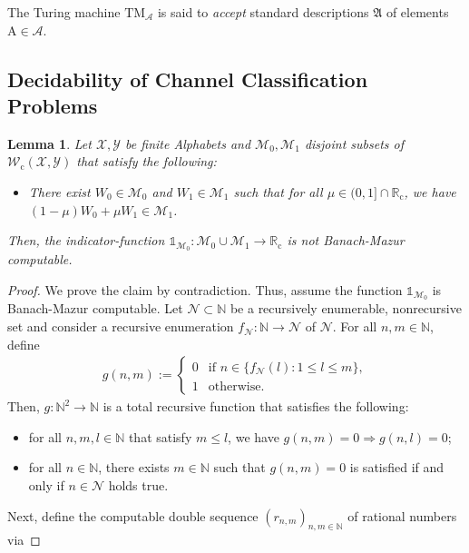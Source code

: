 \documentclass[conference]{IEEEtran}
\def\A{{\mathcal A}}
\def\X{{\mathcal X}}
\def\Y{{\mathcal Y}}
\def\M{{\mathcal M}}
\def\N{{\mathcal N}}
\def\W{{\mathcal W}}
\def\NN{{\mathbb N}}
\def\RR{{\mathbb R}}
\newcommand{\RRc}{\RR_{\mathrm{c}}}
\def\mA{\bm{\mathrm{A}}}
\newcommand{\TM}{\mathrm{TM}}
\newcommand{\Wc}{\W_{\mathrm{c}}}
\newcommand{\revision}[1]{}
\newtheorem{Lemma}[Theorem]{Lemma}
\begin{document}
	\noindent The Turing machine \(\TM_\A\) is said to \emph{accept} standard descriptions \(\mathfrak{A}\) of elements \(\mA\in\A\).
	
	\revision{Decidability, recursiveness, the indicator function and their relation.}
	
	\subsection{Decidability of Channel Classification Problems}
	\begin{Lemma}	\label{lem:IndicatorFunctionBanachMazur}
					Let \(\X,\Y\) be finite Alphabets and \(\M_0, \M_1\) disjoint subsets of \(\Wc(\X,\Y)\) that satisfy the following:
					\begin{itemize}	\item There exist \(W_0\in\M_0\) and \(W_1\in\M_1\) such that for all \(\mu \in (0,1]\cap \RRc\), 													
										we have \((1-\mu)W_0 + \mu W_1 \in \M_1\). 
					\end{itemize}
					Then, the indicator-function \(\mathds{1}_{\M_0} : \M_0\cup \M_1 \rightarrow \RRc\) is \emph{not} Banach-Mazur computable.
	\end{Lemma}\begin{proof}
					We prove the claim by contradiction. Thus, assume the function \(\mathds{1}_{\M_0}\) is Banach-Mazur computable. Let 
					\(\N\subset \NN\) be a recursively enumerable, nonrecursive set and consider a recursive enumeration \(f_\N : \NN \rightarrow \N\)
					of \(\N\). For all \(n,m\in\NN\), define
					\begin{align}	g(n,m) := 	\begin{cases}	0 &\text{if~} n \in \big\{f_\N(l) : 1 \leq l \leq m\big\}, \\ 	
																1 &\text{otherwise}.
												\end{cases}
					\end{align}
					Then, \(g: \NN^2 \rightarrow \NN\) is a total recursive function that satisfies the following:
					\begin{itemize}	\item 	for all \(n,m,l\in\NN\) that satisfy \(m\leq l\), we have \linebreak \(g(n,m) = 0 \Rightarrow g(n,l) = 0\);
									\item	for all \(n\in\NN\), there exists \(m\in\NN\) such that \(g(n,m) = 0\) is satisfied if and only if 
											\(n\in \N\) holds true.
					\end{itemize}
					Next, define the computable double sequence \((r_{n,m})_{n,m\in\NN}\) of rational numbers via

\end{proof}
\end{document}
